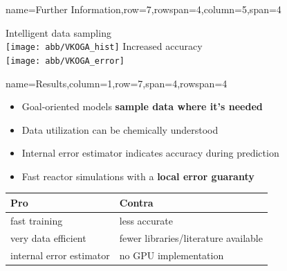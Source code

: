 \documentclass[
	accentcolor=3c,
	boxstyle=colored, %
	colorback=false,
	title=small
	]{tudasciposter}
\begin{document}
\begin{tcbposter}[
	poster={
		columns=8,
		rows=12,
		spacing=1cm,
	},]
\begin{posterboxenv}{name=Further Information,row=7,rowspan=4,column=5,span=4}
	\vspace{.5cm}
	\begin{multicols}{2}
		{\Large \centering Intelligent data sampling\\}
		\vspace{2cm}
		\texttt{[image: abb/VKOGA\_hist]}
		\columnbreak
		{\Large \centering Increased accuracy\\}
		\vspace{2cm}
		\texttt{[image: abb/VKOGA\_error]} %
	\end{multicols}	
\end{posterboxenv}

\begin{posterboxenv}[title=3. Results]{name=Results,column=1,row=7,span=4,rowspan=4}
	\begin{itemize}
		\item Goal-oriented models \textbf{sample data where it's needed}
		\item Data utilization can be chemically understood
		\item Internal error estimator indicates accuracy during prediction
		\item Fast reactor simulations with a \textbf{local error guaranty}
	\end{itemize}
	\vspace{2cm}
	\begin{tabularx}{\textwidth}{XX}
		\toprule
		Pro & Contra \\ \midrule
		fast training & less accurate \\ 
		very data efficient & fewer libraries/literature available\\
		internal error estimator & no GPU implementation\\		
		\bottomrule
	\end{tabularx}%
	


\end{posterboxenv}


\end{tcbposter}
\end{document}
